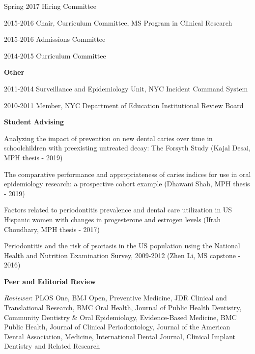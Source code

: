 \documentclass[margin,line]{res}
\begin{document}
\begin{resume}
\vspace*{-2.5mm}
Spring 2017	Hiring Committee

\vspace*{-2.5mm}
2015-2016	Chair, Curriculum Committee, MS Program in Clinical Research 

\vspace*{-2.5mm}
2015-2016	Admissions Committee

\vspace*{-2.5mm}
2014-2015	Curriculum Committee 


{\bf Other} \hfill 

\vspace*{-2.5mm}
2011-2014	Surveillance and Epidemiology Unit, NYC Incident Command System

\vspace*{-2.5mm}
2010-2011	Member, NYC Department of Education Institutional Review Board


{\bf Student Advising} \hfill 

\vspace*{-2.5mm}
Analyzing the impact of prevention on new dental caries over time in schoolchildren with preexisting untreated decay: The Forsyth Study (Kajal Desai, MPH thesis - 2019)

The comparative performance and appropriateness of caries indices for use in oral epidemiology research: a prospective cohort example (Dhawani Shah, MPH thesis - 2019)

Factors related to periodontitis prevalence and dental care utilization in 
US Hispanic women with changes in progesterone and estrogen levels (Ifrah Choudhary, MPH thesis - 2017)

Periodontitis and the risk of psoriasis in the US population using the National Health and Nutrition Examination Survey, 2009-2012 (Zhen Li, MS capstone - 2016)


{\bf Peer and Editorial Review} \hfill 

\vspace*{-2.5mm}
{\em Reviewer}: PLOS One, BMJ Open, Preventive Medicine, JDR Clinical and Translational Research, BMC Oral Health, Journal of Public Health Dentistry, Community Dentistry \& Oral Epidemiology, Evidence-Based Medicine, BMC Public Health, Journal of Clinical Periodontology, Journal of the American Dental Association, Medicine, International Dental Journal, Clinical Implant Dentistry and Related Research


\end{resume}
\end{document}
